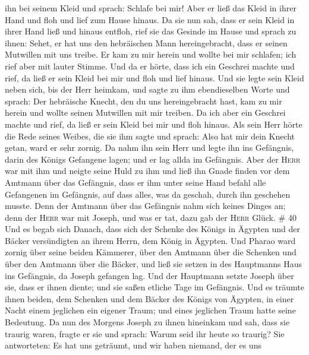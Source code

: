 ihn bei seinem Kleid und sprach: Schlafe bei mir! Aber er ließ das Kleid
in ihrer Hand und floh und lief zum Hause hinaus.  Da sie
nun sah, dass er sein Kleid in ihrer Hand ließ und hinaus entfloh,
 rief sie das Gesinde im Hause und sprach zu ihnen:
Sehet, er hat uns den hebräischen Mann hereingebracht, dass er seinen
Mutwillen mit uns treibe. Er kam zu mir herein und wollte bei mir
schlafen; ich rief aber mit lauter Stimme.  Und da er
hörte, dass ich ein Geschrei machte und rief, da ließ er sein Kleid bei
mir und floh und lief hinaus.  Und sie legte sein Kleid
neben sich, bis der Herr heimkam,  und sagte zu ihm
ebendieselben Worte und sprach: Der hebräische Knecht, den du uns
hereingebracht hast, kam zu mir herein und wollte seinen Mutwillen mit
mir treiben.  Da ich aber ein Geschrei machte und rief,
da ließ er sein Kleid bei mir und floh hinaus.  Als sein
Herr hörte die Rede seines Weibes, die sie ihm sagte und sprach: Also
hat mir dein Knecht getan, ward er sehr zornig.  Da nahm
ihn sein Herr und legte ihn ins Gefängnis, darin des Königs Gefangene
lagen; und er lag allda im Gefängnis.  Aber der
\textsc{Herr} war mit ihm und neigte seine Huld zu ihm und ließ ihn
Gnade finden vor dem Amtmann über das Gefängnis,  dass er
ihm unter seine Hand befahl alle Gefangenen im Gefängnis, auf dass
alles, was da geschah, durch ihn geschehen musste.  Denn
der Amtmann über das Gefängnis nahm sich keines Dinges an; denn der
\textsc{Herr} war mit Joseph, und was er tat, dazu gab der \textsc{Herr}
Glück. \# 40  Und es begab sich Danach, dass sich der
Schenke des Königs in Ägypten und der Bäcker versündigten an ihrem
Herrn, dem König in Ägypten.  Und Pharao ward zornig über
seine beiden Kämmerer, über den Amtmann über die Schenken und über den
Amtmann über die Bäcker,  und ließ sie setzen in des
Hauptmanns Haus ins Gefängnis, da Joseph gefangen lag. 
Und der Hauptmann setzte Joseph über sie, dass er ihnen diente; und sie
saßen etliche Tage im Gefängnis.  Und es träumte ihnen
beiden, dem Schenken und dem Bäcker des Königs von Ägypten, in einer
Nacht einem jeglichen ein eigener Traum; und eines jeglichen Traum hatte
seine Bedeutung.  Da nun des Morgens Joseph zu ihnen
hineinkam und sah, dass sie traurig waren,  fragte er sie
und sprach: Warum seid ihr heute so traurig?  Sie
antworteten: Es hat uns geträumt, und wir haben niemand, der es uns
